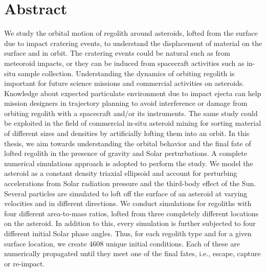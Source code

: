 \chapter*{Abstract}

We study the orbital motion of regolith around asteroids, lofted from the surface due to impact cratering events, to understand the displacement of material on the surface and in orbit. The cratering events could be natural such as from meteoroid impacts, or they can be induced from spacecraft activities such as in-situ sample collection. Understanding the dynamics of orbiting regolith is important for future science missions and commercial activities on asteroids. Knowledge about expected particulate environment due to impact ejecta can help mission designers in trajectory planning to avoid interference or damage from orbiting regolith with a spacecraft and/or its instruments. The same study could be exploited in the field of commercial in-situ asteroid mining for sorting material of different sizes and densities by artificially lofting them into an orbit.
\newline\newline
In this thesis, we aim towards understanding the orbital behavior and the final fate of lofted regolith in the presence of gravity and Solar perturbations. A complete numerical simulations approach is adopted to perform the study. We model the asteroid as a constant density triaxial ellipsoid and account for perturbing accelerations from Solar radiation pressure and the third-body effect of the Sun. Several particles are simulated to loft off the surface of an asteroid at varying velocities and in different directions. We conduct simulations for regoliths with four different area-to-mass ratios, lofted from three completely different locations on the asteroid. In addition to this, every simulation is further subjected to four different initial Solar phase angles. Thus, for each regolith type and for a given surface location, we create 4608 unique initial conditions. Each of these are numerically propagated until they meet one of the final fates, i.e., escape, capture or re-impact.
\newline\newline
